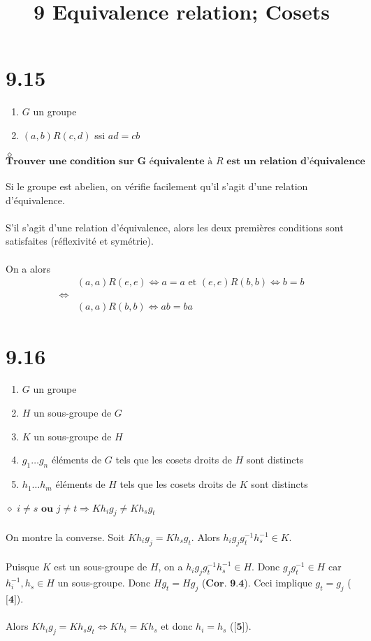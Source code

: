 \documentclass[a4paper,10pt]{article}
\title{9 Equivalence relation; Cosets}
\begin{document}
\maketitle

\section*{9.15}
\begin{enumerate}
  \item $G$ un groupe 
  \item $(a,b)R(c,d)$ ssi $ad = cb$
\end{enumerate}
$\diamond$ $\textbf{Trouver une condition sur G équivalente à } R \textbf{ est un relation d'équivalence}$
\\
\\
Si le groupe est abelien, on vérifie facilement qu'il s'agit d'une relation d'équivalence.
\\
\\
S'il s'agit d'une relation d'équivalence, alors les deux premières conditions sont satisfaites (réflexivité et symétrie).
\\
\\
On a alors
\begin{align*}
 & (a,a)R(e,e) \Leftrightarrow a = a \text{ et } (e,e)R(b,b) \Leftrightarrow b = b \\
 \Leftrightarrow \\
 & (a,a)R(b,b) \Leftrightarrow ab = ba
\end{align*}

\section*{9.16}
\begin{enumerate}
 \item $G$ un groupe
 \item $H$ un sous-groupe de $G$
 \item $K$ un sous-groupe de $H$
 \item $g_1 \dots g_n$ éléments de $G$ tels que les cosets droits de $H$ sont distincts
 \item $h_1 \dots h_m$ éléments de $H$ tels que les cosets droits de $K$ sont distincts
\end{enumerate}
$\diamond$ $ i \not= s \textbf{ ou } j \not= t \Rightarrow Kh_i g_j \not = Kh_s g_t$
\\
\\
On montre la converse. Soit $Kh_i g_j = Kh_s g_t$. Alors $h_i g_j g_t^{-1} h_s^{-1} \in K$.
\\
\\
Puisque $K$ est un sous-groupe de $H$, on a $h_i g_j g_t^{-1} h_s^{-1} \in H$. Donc $g_j g_t^{-1} \in H$ car 
$h_i^{-1}, h_s \in H$ un sous-groupe. Donc $H g_t = H g_j$ ($\textbf{Cor. 9.4}$). Ceci
implique $g_t = g_j$ ($\textbf{[4]}$).
\\
\\
Alors $Kh_i g_j = Kh_s g_t \Leftrightarrow Kh_i = Kh_s$ et donc $h_i = h_s$ ($\textbf{[5]}$).
\end{document}
